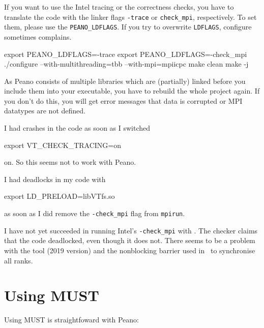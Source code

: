 If you want to use the Intel tracing or the correctness checks, you have to
translate the code with the linker flags \texttt{-trace} or \texttt{check\_mpi},
respectively.
To set them, please use the \texttt{PEANO\_LDFLAGS}.
If you try to overwrite \texttt{LDFLAGS}, configure sometimes complains.


\begin{code}
 export PEANO_LDFLAGS=-trace
 export PEANO_LDFLAGS=-check_mpi
 ./configure --with-multithreading=tbb --with-mpi=mpiicpc
 make clean
 make -j
\end{code}


\noindent
As Peano consists of multiple libraries which are (partially) linked before you
include them into your executable, you have to rebuild the whole project again.
If you don't do this, you will get error messages that data is corrupted or MPI
datatypes are not defined.



\begin{remark}
 I had crashes in the code as soon as I switched
 \begin{code}
 export VT_CHECK_TRACING=on
 \end{code}
 on. So this seems not to work with Peano.
\end{remark}



\begin{remark}
 I had deadlocks in my code with
 \begin{code}
 export LD_PRELOAD=libVTfs.so
 \end{code}
 as soon as I did remove the \texttt{-check\_mpi} flag from \texttt{mpirun}.
\end{remark}



\begin{remark}
 I have not yet succeeded in running Intel's \texttt{-check\_mpi} with \ExaHyPE.
 The checker claims that the code deadlocked, even though it does not. There
 seems to be a problem with the tool (2019 version) and the nonblocking barrier
 used in \ExaHyPE\ to synchronise all ranks.
\end{remark}


\section{Using MUST}
\label{section:supercomputers:MUST}

Using MUST is straightfoward with Peano:


